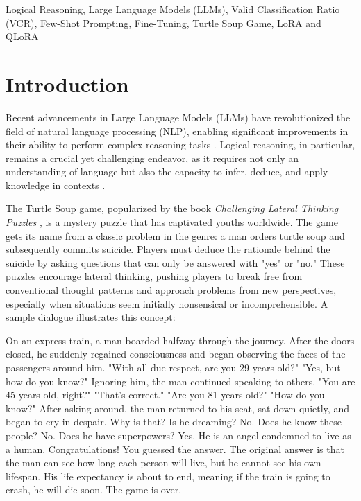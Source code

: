 \documentclass[conference]{IEEEtran}
\begin{document}
\begin{IEEEkeywords}
Logical Reasoning, Large Language Models (LLMs), Valid Classification Ratio (VCR), Few-Shot Prompting, Fine-Tuning, Turtle Soup Game, LoRA and QLoRA
\end{IEEEkeywords}
\section{Introduction}

Recent advancements in Large Language Models (LLMs) have revolutionized the field of natural language processing (NLP), enabling significant improvements in their ability to perform complex reasoning tasks \cite{chen2024large, hadi2024large}. Logical reasoning, in particular, remains a crucial yet challenging endeavor, as it requires not only an understanding of language but also the capacity to infer, deduce, and apply knowledge in contexts \cite{wang2024can, chu2024beyond}.

The Turtle Soup game, popularized by the book \textit{Challenging Lateral Thinking Puzzles} \cite{sloane1993challenging}, is a mystery puzzle that has captivated youths worldwide. The game gets its name from a classic problem in the genre: a man orders turtle soup and subsequently commits suicide. Players must deduce the rationale behind the suicide by asking questions that can only be answered with "yes" or "no." These puzzles encourage lateral thinking, pushing players to break free from conventional thought patterns and approach problems from new perspectives, especially when situations seem initially nonsensical or incomprehensible. A sample dialogue illustrates this concept:

\small{
\setlength{\baselineskip}{0.5\baselineskip} %
\begin{dialogue}
 On an express train, a man boarded halfway through the journey. After the doors closed, he suddenly regained consciousness and began observing the faces of the passengers around him. "With all due respect, are you 29 years old?" "Yes, but how do you know?" Ignoring him, the man continued speaking to others. "You are 45 years old, right?" "That's correct." "Are you 81 years old?" "How do you know?" After asking around, the man returned to his seat, sat down quietly, and began to cry in despair. Why is that?
 Is he dreaming?
 No.
 Does he know these people?
 No.
 Does he have superpowers?
 Yes.
 He is an angel condemned to live as a human.
 Congratulations! You guessed the answer. The original answer is that the man can see how long each person will live, but he cannot see his own lifespan. His life expectancy is about to end, meaning if the train is going to crash, he will die soon. The game is over.
\end{dialogue}
}
\end{document}
